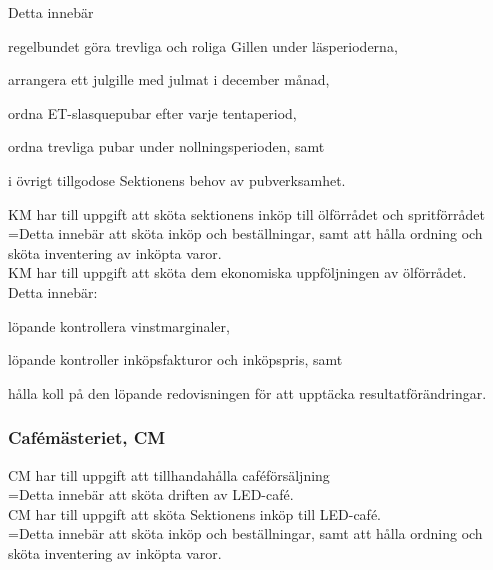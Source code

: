 \documentclass[10pt]{article}
\begin{document}
Detta innebär
\begin{attlist}
    \item regelbundet göra trevliga och roliga Gillen under läsperioderna,
    \item arrangera ett julgille med julmat i december månad,
    \item ordna ET-slasquepubar efter varje tentaperiod,
    \item ordna trevliga pubar under nollningsperioden, samt
    \item i övrigt tillgodose Sektionens behov av pubverksamhet.
\end{attlist}

\noindent KM har till uppgift att sköta sektionens inköp till ölförrådet
och spritförrådet \\

\hangindent=\parindent Detta innebär att sköta inköp och beställningar,
samt att hålla ordning och sköta inventering av inköpta varor. \\

\noindent KM har till uppgift att sköta dem ekonomiska uppföljningen av
ölförrådet. \\

Detta innebär:
\begin{attlist}
    \item löpande kontrollera vinstmarginaler,
    \item löpande kontroller inköpsfakturor och inköpspris, samt
    \item hålla koll på den löpande redovisningen för att upptäcka
        resultatförändringar.
\end{attlist}
\subsubsection{Cafémästeriet, CM}

\noindent CM har till uppgift att tillhandahålla caféförsäljning \\

\hangindent=\parindent Detta innebär att sköta driften av LED-café. \\

\noindent CM har till uppgift att sköta Sektionens inköp till LED-café. \\

\hangindent=\parindent Detta innebär att sköta inköp och beställningar,
samt att hålla ordning och sköta inventering av inköpta varor. \\
\end{document}
